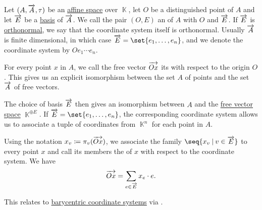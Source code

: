 \begin{definition}\label{def:affine_coordinate_system}
  Let \( (A, \overrightarrow{A}, \tau) \) be an \hyperref[def:affine_space]{affine space} over \( \BbbK \), let \( O \) be a distinguished point of \( A \) and let \( \overrightarrow{E} \) be a \hyperref[def:hamel_basis]{basis} of \( \overrightarrow{A} \). We call the pair \( (O, E) \) an  of \( A \) with  \( O \) and  \( \overrightarrow{E} \). If \( \overrightarrow{E} \) is \hyperref[def:orthogonality]{orthonormal}, we say that the coordinate system itself is orthonormal. Usually \( \overrightarrow{A} \) is finite dimensional, in which case \( \vect E = \set{ e_1, \ldots, e_n } \), and we denote the coordinate system by \( O e_1 \cdots e_n \).

  For every point \( x \) in \( A \), we call the free vector \( \overrightarrow{Ox} \) its  with respect to the origin \( O \). This gives us an explicit isomorphism between the set \( A \) of points and the set \( \overrightarrow{A} \) of free vectors.

  The choice of basis \( \overrightarrow{E} \) then gives an isomorphism between \( A \) and the \hyperref[def:free_semimodule]{free vector space} \( \BbbK^{\oplus E} \). If \( \vect E = \set{ e_1, \ldots, e_n } \), the corresponding coordinate system allows us to associate a tuple of coordinates from \( \BbbK^n \) for each point in \( A \).

  Using the notation \( x_v \coloneqq \pi_v(\overrightarrow{Ox}) \), we associate the family \( \seq{ x_v \given v \in \vect E } \) to every point \( x \) and call its members the  of \( x \) with respect to the coordinate system. We have
  \begin{equation}\label{eq:def:affine_coordinate_system/coordinates}
    \overrightarrow{Ox} = \sum_{e \in \overrightarrow{E}} x_e \cdot e.
  \end{equation}

  This relates to \hyperref[def:barycentric_coordinate_system]{barycentric coordinate systems} via .
\end{definition}

